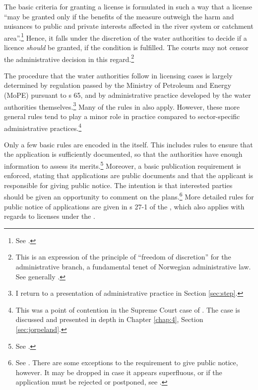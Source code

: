 The basic criteria for granting a license is formulated in such a way that a license ``may be granted only if the benefits of the measure outweigh the harm and nuisances to public and private interests affected in the river system or catchment area''.\footnote{See \cite[25]{wra00}.} Hence, it falls under the discretion of the water authorities to decide if a licence {\it should} be granted, if the condition is fulfilled. The courts may not censor the administrative decision in this regard.\footnote{This is an expression of the principle of ``freedom of discretion'' for the administrative branch, a fundamental tenet of Norwegian administrative law. See generally \cite[71-74]{eckhoff14}.}

The procedure that the water authorities follow in licensing cases is largely determined by regulation passed by the Ministry of Petroleum and Energy (MoPE) pursuant to s 65, and by administrative practice developed by the water authorities themselves.\footnote{I return to a presentation of administrative practice in Section \ref{sec:step}.} Many of the rules in \cite{paa67} also apply. However, these more general rules tend to play a minor role in practice compared to sector-specific administrative practices.\footnote{This was a point of contention in the Supreme Court case of \cite{jorpeland11}. The case is discussed and presented in depth in Chapter \ref{chap:4}, Section \ref{sec:jorpeland}.}

Only a few basic rules are encoded in the \cite{wra00} itself. This includes rules to ensure that the application is sufficiently documented, so that the authorities have enough information to assess its merits.\footnote{See \cite[23]{wra00}.} Moreover, a basic publication requirement is enforced, stating that applications are public documents and that the applicant is responsible for giving public notice. The intention is that interested parties should be given an opportunity to comment on the plans.\footnote{See \cite[24]{wra00}. There are some exceptions to the requirement to give public notice, however. It may be dropped in case it appears superfluous, or if the application must be rejected or postponed, see \cite[24a-24c]{wra00}.} More detailed rules for public notice of applications are given in s 27-1 of the \cite{pb08}, which also applies with regards to licenses under the \cite[8]{wra00}.


